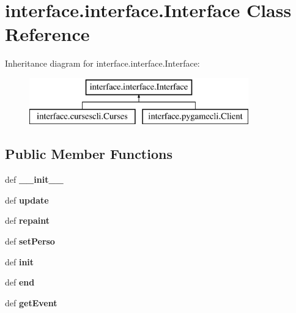 \hypertarget{classinterface_1_1interface_1_1_interface}{\section{interface.\-interface.\-Interface \-Class \-Reference}
\label{classinterface_1_1interface_1_1_interface}
}
\-Inheritance diagram for interface.\-interface.\-Interface\-:\begin{figure}[H]
\begin{center}
\leavevmode
\includegraphics[height=2.000000cm]{classinterface_1_1interface_1_1_interface}
\end{center}
\end{figure}
\subsection*{\-Public \-Member \-Functions}
\begin{DoxyCompactItemize}
\item 
\hypertarget{classinterface_1_1interface_1_1_interface_ac897e94279885c6ac7368b26280b1ca3}{def {\bfseries \-\_\-\-\_\-init\-\_\-\-\_\-}}\label{classinterface_1_1interface_1_1_interface_ac897e94279885c6ac7368b26280b1ca3}

\item 
\hypertarget{classinterface_1_1interface_1_1_interface_ae88eadf76465fc08de5b43ceb851b33c}{def {\bfseries update}}\label{classinterface_1_1interface_1_1_interface_ae88eadf76465fc08de5b43ceb851b33c}

\item 
\hypertarget{classinterface_1_1interface_1_1_interface_af98554929f55ff181f077938c49be445}{def {\bfseries repaint}}\label{classinterface_1_1interface_1_1_interface_af98554929f55ff181f077938c49be445}

\item 
\hypertarget{classinterface_1_1interface_1_1_interface_a5d5d771f07df8593a3c9a16b3c93cf87}{def {\bfseries set\-Perso}}\label{classinterface_1_1interface_1_1_interface_a5d5d771f07df8593a3c9a16b3c93cf87}

\item 
\hypertarget{classinterface_1_1interface_1_1_interface_a65d6c992d5c9ffe07bec1b57b05f171c}{def {\bfseries init}}\label{classinterface_1_1interface_1_1_interface_a65d6c992d5c9ffe07bec1b57b05f171c}

\item 
\hypertarget{classinterface_1_1interface_1_1_interface_aad5e69ce9ff8080f12d744ca1d7e31d9}{def {\bfseries end}}\label{classinterface_1_1interface_1_1_interface_aad5e69ce9ff8080f12d744ca1d7e31d9}

\item 
\hypertarget{classinterface_1_1interface_1_1_interface_af1f6baa08b21da6eb3458f91b9fc43a6}{def {\bfseries get\-Event}}\label{classinterface_1_1interface_1_1_interface_af1f6baa08b21da6eb3458f91b9fc43a6}

\end{DoxyCompactItemize}
